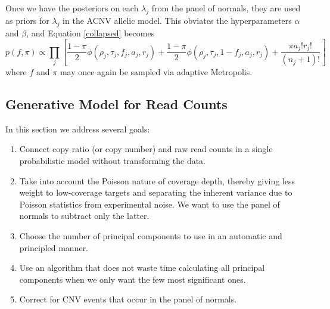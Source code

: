 \documentclass[nofootinbib,amssymb,amsmath]{revtex4}
\begin{document}
Once we have the posteriors on each $\lambda_j$ from the panel of normals, they are used as priors for $\lambda_j$ in the ACNV allelic model.  This obviates the hyperparameters $\alpha$ and $\beta$, and Equation \ref{collapsed} becomes
%
\begin{equation}
p(f, \pi) \propto \prod_j 
\left[    \frac{1-\pi}{2} \phi(\rho_j, \tau_j, f_j, a_j, r_j)  +
\frac{1-\pi}{2} \phi(\rho_j, \tau_j, 1 - f_j, a_j, r_j)  +
 \frac{ \pi a_j! r_j!}{(n_j + 1)!}    \right]
 \label{collapsed_using_pon}
\end{equation}
%
where $f$ and $\pi$ may once again be sampled via adaptive Metropolis.

\subsection{Generative Model for Read Counts} \label{coverage-model}
In this section we address several goals:

\begin{enumerate}

\item Connect copy ratio (or copy number) and raw read counts in a single probabilistic model without transforming the data.

\item Take into account the Poisson nature of coverage depth, thereby giving less weight to low-coverage targets and separating the inherent variance due to Poisson statistics from experimental noise.  We want to use the panel of normals to subtract only the latter.

\item Choose the number of principal components to use in an automatic and principled manner.

\item Use an algorithm that does not waste time calculating all principal components when we only want the few most significant ones.

\item Correct for CNV events that occur in the panel of normals.

\end{enumerate}
\end{document}
